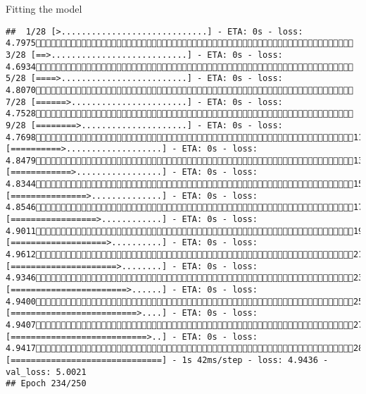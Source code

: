 \documentclass[
  ignorenonframetext,
]{beamer}
\begin{document}
\begin{frame}[fragile]{Fitting the model}
\begin{verbatim}
##  1/28 [>.............................] - ETA: 0s - loss: 4.7975 3/28 [==>...........................] - ETA: 0s - loss: 4.6934 5/28 [====>.........................] - ETA: 0s - loss: 4.8070 7/28 [======>.......................] - ETA: 0s - loss: 4.7528 9/28 [========>.....................] - ETA: 0s - loss: 4.769811/28 [==========>...................] - ETA: 0s - loss: 4.847913/28 [============>.................] - ETA: 0s - loss: 4.834415/28 [===============>..............] - ETA: 0s - loss: 4.854617/28 [=================>............] - ETA: 0s - loss: 4.901119/28 [===================>..........] - ETA: 0s - loss: 4.961221/28 [=====================>........] - ETA: 0s - loss: 4.934623/28 [=======================>......] - ETA: 0s - loss: 4.940025/28 [=========================>....] - ETA: 0s - loss: 4.940727/28 [===========================>..] - ETA: 0s - loss: 4.941728/28 [==============================] - 1s 42ms/step - loss: 4.9436 - val_loss: 5.0021
## Epoch 234/250

\end{verbatim}
\end{frame}
\end{document}
